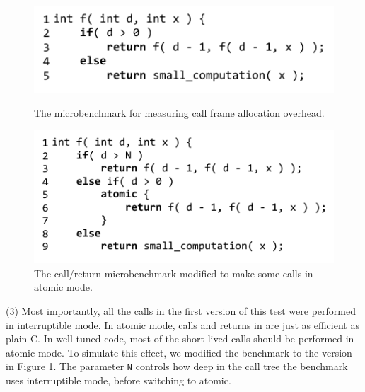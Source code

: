 \documentclass[acmsmall,anonymous,review]{acmart}\settopmatter{printfolios=true,printccs=false,printacmref=false}
\begin{document}
\begin{figure}
    \centering
    \begin{minipage}[t]{0.47\textwidth}
        \centering
        \includegraphics[width=1.0\textwidth]{Code/just_calling_benchmark}
        \caption{The microbenchmark for measuring call frame allocation overhead.}
        \label{fig:micro_calling}
    \end{minipage}\hfill
    \begin{minipage}[t]{0.47\textwidth}
        \centering
        \includegraphics[width=1.0\textwidth]{Code/just_calling_n_benchmark}
        \caption{The call/return microbenchmark modified to make some calls in atomic mode.}
        \label{fig:micro_calling_n}
    \end{minipage}
\end{figure}

(3) Most importantly, all the calls in the first version of this test were performed in interruptible mode.
In atomic mode, calls and returns in \charcoal{} are just as efficient as plain C.
In well-tuned \charcoal{} code, most of the short-lived calls should be performed in atomic mode.
To simulate this effect, we modified the benchmark to the version in Figure \ref{fig:micro_calling_n}.
The parameter \texttt{N} controls how deep in the call tree the benchmark uses interruptible mode, before switching to atomic.
\end{document}
